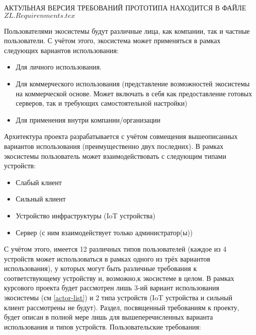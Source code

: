 \Large{АКТУЛЬНАЯ ВЕРСИЯ ТРЕБОВАНИЙ ПРОТОТИПА НАХОДИТСЯ В ФАЙЛЕ \(ZL.Requirenments.tex\)}

Пользователями экосистемы будут различные лица, как компании, так и частные пользователи. С учётом этого, экосистема может применяться в рамках следующих вариантов использования:
\begin{itemize}
   \item Для личного использования.
   \item Для коммерческого использования (представление возможностей экосистемы на коммерческой основе. Может включать в себя как предоставление готовых серверов, так и требующих самостоятельной настройки)
   \item Для применения внутри компании/организации
         \label{actor-list}
\end{itemize}
Архитектура проекта разрабатывается с учётом совмещения вышеописанных вариантов использования (преимущественно двух последних).
В рамках экосистемы пользователь может взаимодействовать с следующим типами устройств:
\begin{itemize}
   \item Слабый клиент
   \item Сильный клиент
   \item Устройство инфраструктуры (IoT устройства)
   \item Сервер (с ним взаимодействует только администратор(ы))
\end{itemize}
С учётом этого, имеется 12 различных типов пользователей (каждое из 4 устройств может использоваться в рамках одного из трёх вариантов использования), у которых могут быть различные требования к соответствующему устройству и, возможно,к экосистеме в целом.
В рамках курсового проекта будет рассмотрен лишь 3-ий вариант использования экосистемы (см \ref{actor-list}) и 2 типа устройств (IoT устройства и сильный клиент рассмотрены не будут). Раздел, посвященный требованиям к проекту, будет описан в полной мере лишь для вышеперечисленных варианта использования и типов устройств.
Пользовательские требования:
